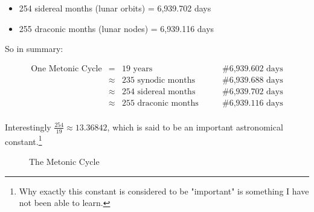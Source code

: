 \documentclass[11pt, oneside]{article}   	%
\theoremstyle{definition}
\begin{document}
\begin{itemize}
\item 254 sidereal months (lunar orbits) = 6,939.702 days
\item 255 draconic months (lunar nodes) = 6,939.116 days
\end{itemize}

\noindent
So in  summary: 

\begin{equation*}
\begin{array}{lllll}
\text{One Metonic Cycle}
&=& \text{19 years}                                  &\qquad  \mathrel{\#} \text {6,939.602 days}    \\
&\approx& \text {235 synodic months}    &\qquad  \mathrel{\#} \text{6,939.688 days}      \\
&\approx& \text {254 sidereal months}    &\qquad  \mathrel{\#} \text {6,939.702 days}     \\
&\approx& \text {255 draconic months}   &\qquad  \mathrel{\#} \text {6,939.116 days}     \\
\end{array}
\end{equation*}




\bigskip
\noindent
Interestingly $\frac{254}{19} \approx 13.36842$,  which is said to be an important astronomical constant.\footnote{Why exactly this constant is considered to be "important" is something 
I have not been able to learn.}

\bigskip
\bigskip
\begin{figure}[H]
\caption{The Metonic Cycle \cite{youtube:freeth2021}}
\label{fig:metonic_cycle}
\end{figure}
\end{document}
